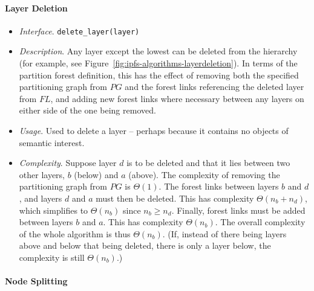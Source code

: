 
\paragraph{Layer Deletion}

\begin{itemize}

\item \emph{Interface}. \texttt{delete_layer(layer)}

\item \emph{Description}. Any layer except the lowest can be deleted from the hierarchy (for example, see Figure~\ref{fig:ipfs-algorithms-layerdeletion}). In terms of the partition forest definition, this has the effect of removing both the specified partitioning graph from $\textit{PG}$ and the forest links referencing the deleted layer from $\textit{FL}$, and adding new forest links where necessary between any layers on either side of the one being removed.

\item \emph{Usage}. Used to delete a layer -- perhaps because it contains no objects of semantic interest.

\item \emph{Complexity}. Suppose layer $d$ is to be deleted and that it lies between two other layers, $b$ (below) and $a$ (above). The complexity of removing the partitioning graph from $\textit{PG}$ is $\Theta(1)$. The forest links between layers $b$ and $d$, and layers $d$ and $a$ must then be deleted. This has complexity $\Theta(n_b + n_d)$, which simplifies to $\Theta(n_b)$ since $n_b \ge n_d$. Finally, forest links must be added between layers $b$ and $a$. This has complexity $\Theta(n_b)$. The overall complexity of the whole algorithm is thus $\Theta(n_b)$. (If, instead of there being layers above and below that being deleted, there is only a layer below, the complexity is still $\Theta(n_b)$.)

\end{itemize}


\paragraph{Node Splitting}

